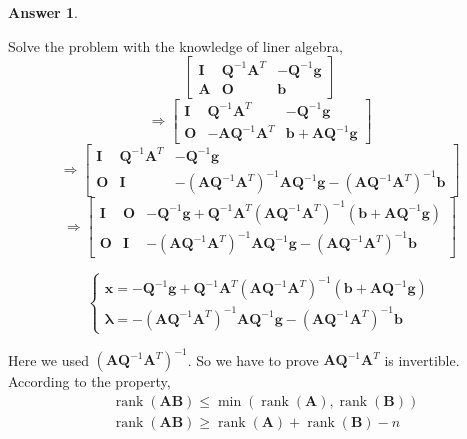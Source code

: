 \documentclass{article}
\theoremstyle{definition}
\newtheorem{ans}{Answer}
\begin{document}
\begin{ans}
\begin{enumerate}[(a)]
			Solve the problem with the knowledge of liner algebra, 
			$$
			\left[\begin{array}{ccc}
				\boldsymbol{I} & \boldsymbol{Q}^{-1}\boldsymbol{A}^T & -\boldsymbol{Q}^{-1}\boldsymbol{g} \\
				\boldsymbol{A} & \boldsymbol{O} & \boldsymbol{b}
			\end{array}\right]
			$$
			$$
			\Rightarrow
			\left[\begin{array}{ccc}
				\boldsymbol{I} & \boldsymbol{Q}^{-1}\boldsymbol{A}^T & -\boldsymbol{Q}^{-1}\boldsymbol{g} \\
				\boldsymbol{O} & -\boldsymbol{AQ}^{-1}\boldsymbol{A}^T & \boldsymbol{b}+\boldsymbol{AQ}^{-1}\boldsymbol{g}
			\end{array}\right]
			$$
			$$
			\Rightarrow
			\left[\begin{array}{ccc}
				\boldsymbol{I} & \boldsymbol{Q}^{-1}\boldsymbol{A}^T & -\boldsymbol{Q}^{-1}\boldsymbol{g} \\
				\boldsymbol{O} & \boldsymbol{I} & -(\boldsymbol{AQ}^{-1}\boldsymbol{A}^T)^{-1}\boldsymbol{AQ}^{-1}\boldsymbol{g}-(\boldsymbol{AQ}^{-1}\boldsymbol{A}^T)^{-1}\boldsymbol{b}
			\end{array}\right]
			$$
			$$
			\Rightarrow
			\left[\begin{array}{ccc}
				\boldsymbol{I} & \boldsymbol{O} & -\boldsymbol{Q}^{-1}\boldsymbol{g}+\boldsymbol{Q}^{-1}\boldsymbol{A}^T(\boldsymbol{AQ}^{-1}\boldsymbol{A}^T)^{-1}(\boldsymbol{b}+\boldsymbol{AQ}^{-1}\boldsymbol{g}) \\
				\boldsymbol{O} & \boldsymbol{I} & -(\boldsymbol{AQ}^{-1}\boldsymbol{A}^T)^{-1}\boldsymbol{AQ}^{-1}\boldsymbol{g}-(\boldsymbol{AQ}^{-1}\boldsymbol{A}^T)^{-1}\boldsymbol{b}
			\end{array}\right]
			$$
			
			$$
			\left\{
			\begin{array}{ll}
				\boldsymbol{x}= -\boldsymbol{Q}^{-1}\boldsymbol{g}+\boldsymbol{Q}^{-1}\boldsymbol{A}^T(\boldsymbol{AQ}^{-1}\boldsymbol{A}^T)^{-1}(\boldsymbol{b}+\boldsymbol{AQ}^{-1}\boldsymbol{g}) \\
				\boldsymbol{\lambda}=-(\boldsymbol{AQ}^{-1}\boldsymbol{A}^T)^{-1}\boldsymbol{AQ}^{-1}\boldsymbol{g}-(\boldsymbol{AQ}^{-1}\boldsymbol{A}^T)^{-1}\boldsymbol{b}
			\end{array}\right.
			$$
			
			Here we used $(\boldsymbol{AQ}^{-1}\boldsymbol{A}^T)^{-1}$. So we have to prove $\boldsymbol{AQ}^{-1}\boldsymbol{A}^T$ is invertible. According to the property, 
			$$
			\begin{aligned}
				&\operatorname{rank}(\boldsymbol A \boldsymbol B) \leq \min (\operatorname{rank}(\boldsymbol A), \operatorname{rank}(\boldsymbol B)) \\
				&\operatorname{rank}(\boldsymbol A \boldsymbol B) \geq \operatorname{rank}(\boldsymbol A)+\operatorname{rank}(\boldsymbol B)-n
			\end{aligned}
			$$
			

\end{enumerate}
\end{ans}
\end{document}
